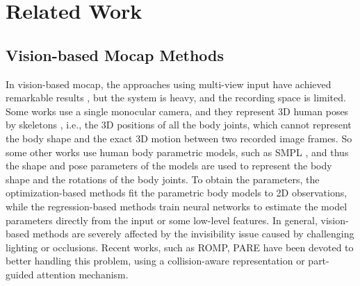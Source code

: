 \section{Related Work}
%

\subsection{Vision-based Mocap Methods}
In vision-based mocap, the approaches using multi-view input have achieved remarkable results \cite{harvesting17, CrossVF, LearnableTO, remelli2020lightweight, chun2023learnable, reddy2021tessetrack}, but the system is heavy, and the recording space is limited. 
%
Some works use a single monocular camera, and they represent 3D human poses by skeletons \cite{pavllo20193d,sharma2019monocular,xu2020deep,zhen2020smap}, i.e., the 3D positions of all the body joints, which cannot represent the body shape and the exact 3D motion between two recorded image frames.
%
So some other works use human body parametric models, such as SMPL \cite{SMPL}, and thus the shape and pose parameters of the models are used to represent the body shape and the rotations of the body joints.
%
%
To obtain the parameters, the optimization-based methods \cite{Lassner, Bogo:ECCV:2016,xiang2019monocular,pavlakos2018learning} fit the parametric body models to 2D observations, while the regression-based methods \cite{kolotouros2019convolutional, hmr, kanazawa2019learning, VIBE, zanfir2021neural, minimal, zhang2022mixste, PhysAware, li2022cliff} train neural networks to estimate the model parameters directly from the input or some low-level features. 
%
%
%
In general, vision-based methods are severely affected by the invisibility issue caused by challenging lighting or occlusions.
%
Recent works, such as ROMP\cite{ROMP}, PARE\cite{PARE} 
have been devoted to better handling this problem, using a collision-aware representation or part-guided attention mechanism.
